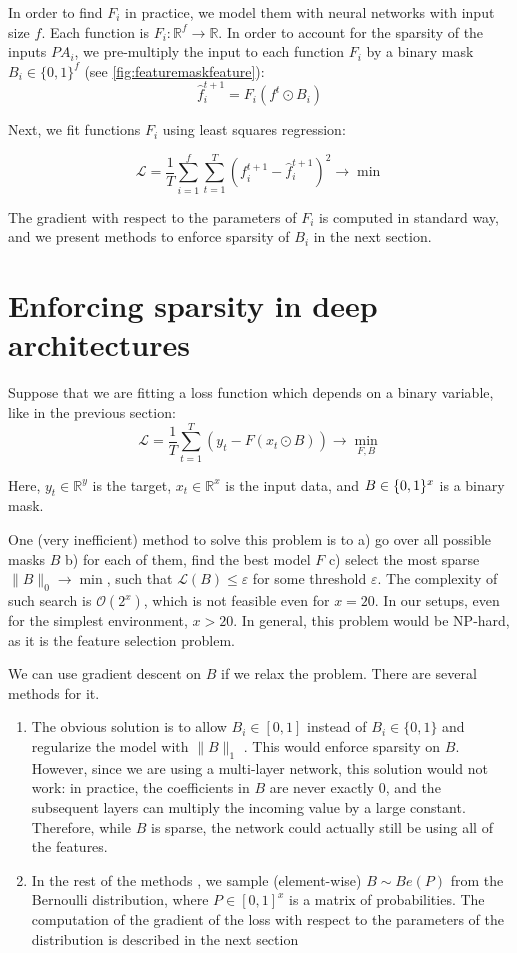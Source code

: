 \documentclass[a4paper,11pt,oneside]{report}
\begin{document}
In order to find $F_i$ in practice, we model them with neural networks \cite{Tank2018,Kalainathan2018, Ng2019} with input size $f$. Each function is $F_i\colon \mathbb R^{f}\to\mathbb R$. In order to account for the sparsity of the inputs $PA_i$, we pre-multiply the input to each function $F_i$ by a binary mask $B_i\in\{0,1\}^f$ (see \autoref{fig:featuremaskfeature}):
$$
\hat{f}_i^{t+1}=F_i(f^t\odot B_i)
$$

Next, we fit functions $F_i$ using least squares regression:

$$
\mathcal L=\frac{1}{T}\sum\limits_{i=1}^f\sum\limits_{t=1}^T \left(f^{t+1}_i-\hat{f}_i^{t+1}\right)^2\to\min
$$

The gradient with respect to the parameters of $F_i$ is computed in standard way, and we present methods to enforce sparsity of $B_i$ in the next section.

\section{Enforcing sparsity in deep architectures}
\label{sec:sparse_deep}
Suppose that we are fitting a loss function which depends on a binary variable, like in the previous section:
$$
\mathcal L=\frac{1}{T}\sum\limits_{t=1}^T(y_t-F(x_t\odot B))\to\min\limits_{F,B}
$$

Here, $y_t\in\mathbb R^y$ is the target, $x_t\in\mathbb R^x$ is the input data, and $B\in\mathbb \{0,1\}^x$ is a binary mask.

One (very inefficient) method to solve this problem is to a) go over all possible masks $B$ b) for each of them, find the best model $F$ c) select the most sparse $\|B\|_0\to\min$, such that $\mathcal L(B)\leq\varepsilon$ for some threshold $\varepsilon$. The complexity of such search is $\mathcal O(2^x)$, which is not feasible even for $x=20$. In our setups, even for the simplest environment, $x>20$. In general, this problem would be NP-hard, as it is the feature selection problem.

We can use gradient descent on $B$ if we relax the problem. There are several methods for it.
\begin{enumerate}
    \item The obvious solution is to allow $B_i\in[0,1]$ instead of $B_i\in\{0,1\}$ and regularize the model with $\|B\|_1$ \cite{Tank2017}. This would enforce sparsity on $B$. However, since we are using a multi-layer network, this solution would not work: in practice, the coefficients in $B$ are never exactly $0$, and the subsequent layers can multiply the incoming value by a large constant. Therefore, while $B$ is sparse, the network could actually still be using all of the features.
    \item In the rest of the methods \cite{Ng2019,Abid2019,Lamb2020,Kalainathan,Yang2020}, we sample (element-wise) $B\sim Be(P)$ from the Bernoulli distribution, where $P\in[0,1]^x$ is a matrix of probabilities. The computation of the gradient of the loss with respect to the parameters of the distribution is described in the next section
\end{enumerate}
\end{document}
